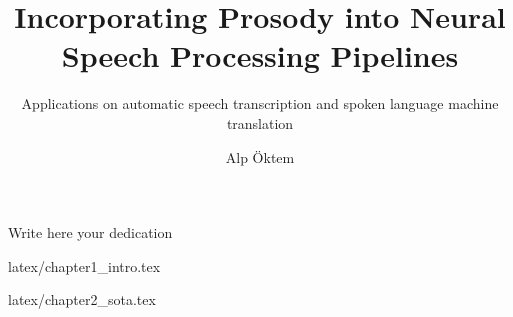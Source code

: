 \documentclass[12pt, a4paper,twoside]{tesi_upf}
\title{Incorporating Prosody into Neural Speech Processing Pipelines}
\subtitle{Applications on automatic speech transcription and spoken language machine translation}
\author{Alp \"Oktem}
\begin{document}

\maketitle

\cleardoublepage


\noindent Write here your dedication

\cleardoublepage



\newpage\leavevmode\thispagestyle{empty}\newpage

\frontmatter


\newpage\leavevmode\thispagestyle{empty}\newpage

\tableofcontents

\listoffigures
{}

\listoftables
{}
\newpage\leavevmode\thispagestyle{empty}\newpage

\mainmatter

 {latex/chapter1_intro.tex}
\newpage\leavevmode\thispagestyle{empty}\newpage

 {latex/chapter2_sota.tex}
\newpage\leavevmode\thispagestyle{empty}\newpage
\end{document}
